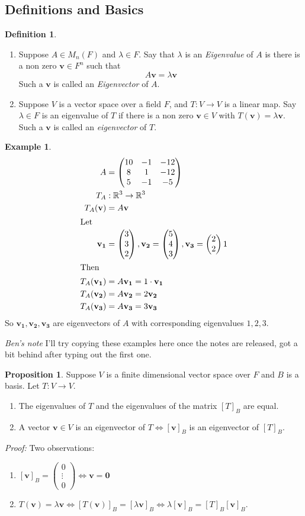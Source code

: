 \documentclass{report}
\theoremstyle{remark}
\theoremstyle{definition}
\newtheorem{definition}[theorem]{Definition}
\theoremstyle{definition}
\newtheorem{example}[theorem]{Example}
\theoremstyle{theorem}
\newtheorem{proposition}[theorem]{Proposition}
\renewcommand{\v}[1]{\mathbf{#1}}
\providecommand{\vectii}[2]{\begin{pmatrix}#1\\#2\end{pmatrix}}
\providecommand{\vectiii}[3]{\begin{pmatrix}#1\\#2\\#3\end{pmatrix}}
\begin{document}
\subsection{Definitions and Basics}
\begin{definition}
\begin{enumerate}
    \item Suppose $A \in M_n(F)$ and $\lambda \in F$. Say that $\lambda$ is an \emph{Eigenvalue} of $A$ is there is a non zero $\v{v} \in F^n$ such that
    \[A\v{v} = \lambda \v{v}\]
    Such a $\v{v}$ is called an \emph{Eigenvector} of $A$.
    \item Suppose $V$ is a vector space over a field $F$, and $T:V \rightarrow V$ is a linear map. Say $\lambda \in F$ is an eigenvalue of $T$ if there is a non zero $\v{v} \in V$ with $T(\v{v}) = \lambda \v{v}$. Such a $\v{v}$ is called an \emph{eigenvector} of $T$.
\end{enumerate}
\end{definition}
\begin{example}
\begin{align*}
    A &= \begin{pmatrix}
    10&-1&-12\\
    8&1&-12\\
    5&-1&-5
    \end{pmatrix}\\
    T_A&:\mathbb{R}^3 \rightarrow \mathbb{R}^3\\
    T_A(\v{v})&=A\v{v}\\
    \intertext{Let}
    \v{v_1}&=\vectiii{3}{3}{2}, \v{v_2}=\vectiii{5}{4}{3}, \v{v_3}=\vectii{2}{2}{1}\\
    \intertext{Then}
    T_A(\v{v_1})&=A\v{v_1}=1\cdot \v{v_1}\\
    T_A(\v{v_2})&= A\v{v_2} = 2 \v{v_2}\\
    T_A(\v{v_3})&=A\v{v_3}=3\v{v_3}
\end{align*}
So $\v{v_1}, \v{v_2}, \v{v_3}$ are eigenvectors of $A$ with corresponding eigenvalues $1,2,3$.
\end{example}
\emph{Ben's note} I'll try copying these examples here once the notes are released, got a bit behind after typing out the first one.
\begin{proposition}
Suppose $V$ is a finite dimensional vector space over $F$ and $B$ is a basis. Let $T:V \rightarrow V$.
\begin{enumerate}[label=\roman*]
    \item The eigenvalues of $T$ and the eigenvalues of the matrix $[T]_B$ are equal.
    \item A vector $\v{v} \in V$ is an eigenvector of $T \iff [\v{v}]_B$ is an eigenvector of $[T]_B$.
\end{enumerate}
\end{proposition}
\emph{Proof:} Two observations:
\begin{enumerate}
    \item $[\v{v}]_B = \vectiii{0}{\vdots}{0}\iff\v v = \v 0$
    \item $T(\v{v})=\lambda \v{v} \iff [T(\v{v})]_B = [\lambda\v{v}]_B \iff \lambda[\v{v}]_B = [T]_B[\v{v}]_B$.
\end{enumerate}
\end{document}
